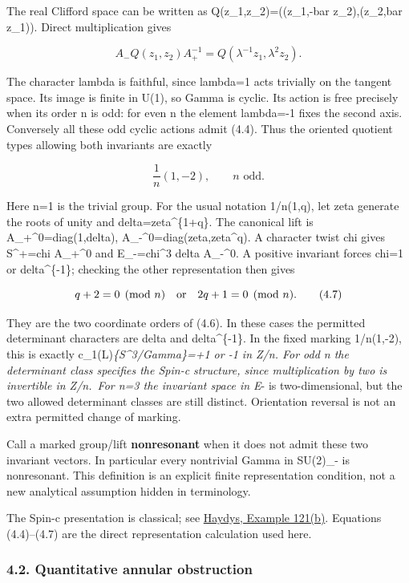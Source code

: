 \documentclass[
  10pt,
]{article}
\begin{document}
The real Clifford space can be written as Q(z\_1,z\_2)=((z\_1,-bar
z\_2),(z\_2,bar z\_1)). Direct multiplication gives

\[
 A_-Q(z_1,z_2)A_+^{-1}
                   =Q(\lambda^{-1}z_1,\lambda^2z_2). \tag{4.5}
\]

The character lambda is faithful, since lambda=1 acts trivially on the
tangent space. Its image is finite in U(1), so Gamma is cyclic. Its
action is free precisely when its order n is odd: for even n the element
lambda=-1 fixes the second axis. Conversely all these odd cyclic actions
admit (4.4). Thus the oriented quotient types allowing both invariants
are exactly

\[
                         \frac1n(1,-2),\qquad n\text{ odd}.        \tag{4.6}
\]

Here n=1 is the trivial group. For the usual notation 1/n(1,q), let zeta
generate the roots of unity and delta=zeta\^{}\{1+q\}. The canonical
lift is A\_+\^{}0=diag(1,delta), A\_-\^{}0=diag(zeta,zeta\^{}q). A
character twist chi gives S\^{}+=chi A\_+\^{}0 and E\_-=chi\^{}3 delta
A\_-\^{}0. A positive invariant forces chi=1 or delta\^{}\{-1\};
checking the other representation then gives

\[
 q+2=0\pmod n\quad\hbox{or}\quad2q+1=0\pmod n.      \tag{4.7}
\]

They are the two coordinate orders of (4.6). In these cases the
permitted determinant characters are delta and delta\^{}\{-1\}. In the
fixed marking 1/n(1,-2), this is exactly
c\_1(L)\textbar{}\emph{\{S\^{}3/Gamma\}=+1 or -1 in Z/n. For odd n the
determinant class specifies the Spin-c structure, since multiplication
by two is invertible in Z/n.~For n=3 the invariant space in E}- is
two-dimensional, but the two allowed determinant classes are still
distinct. Orientation reversal is not an extra permitted change of
marking.

Call a marked group/lift \textbf{nonresonant} when it does not admit
these two invariant vectors. In particular every nontrivial Gamma in
SU(2)\_- is nonresonant. This definition is an explicit finite
representation condition, not a new analytical assumption hidden in
terminology.

The Spin-c presentation is classical; see
\href{https://haydys.net/misc/IntroGaugeTheory_LectNotes.pdf}{Haydys,
Example 121(b)}. Equations (4.4)--(4.7) are the direct representation
calculation used here.

\hypertarget{quantitative-annular-obstruction}{%
\subsubsection{4.2. Quantitative annular
obstruction}\label{quantitative-annular-obstruction}}
\end{document}
